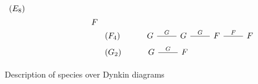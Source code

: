 \documentclass[a4paper, reqno]{amsart}
\theoremstyle{definition}
\begin{document}
\begin{figure}[ht]
\begin{equation*}
\begin{aligned}
\begin{tikzcd}[row sep=0em]
			(E_8) \\
			& & & F \\
			\end{tikzcd} \\[-0.3em]
			&\begin{tikzcd}
			(F_4) & G \arrow["G", r, -] & G \arrow["G", r, -] & F \arrow["F", r, -] & F \\
			\end{tikzcd} \\[-2em]
			&\begin{tikzcd}
			(G_2) & G \arrow["G", r, -] & F
			\end{tikzcd}
		\end{aligned}
	\end{equation*}
	\caption{Description of species over Dynkin diagrams}\label{Figure - Dynkin Diagrams}
\end{figure}
\end{document}
